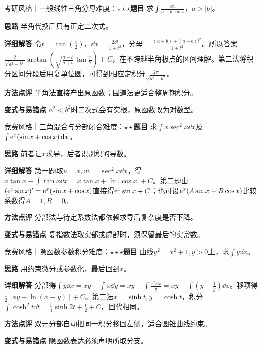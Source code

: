 \begin{example}{考研风格｜一般线性三角分母}{难度：$\star\star\star$}\label{deep:ex:integral_source_deep:triglinear}\textbf{题目} 求$\int\frac{\dd x}{a+b\cos x}$，$a>|b|$。\par\textbf{思路} 半角代换后只有正定二次式。\par\textbf{详细解答} 令$t=\tan(\frac{x}{2})$，$\dd x=\frac{2\dd t}{1+t^2}$，分母$=\frac{(a+b)+(a-b)t^2}{1+t^2}$。所以答案$\frac2{\sqrt{a^2-b^2}}\arctan\!\left(\sqrt{\frac{a-b}{a+b}}\tan\frac x2\right)+C$，在不跨越半角极点的区间理解。第二法将积分区间分段后用复单位圆，可得到相应定积分$\frac{2\pi}{\sqrt{a^2-b^2}}$。\par\textbf{方法点评} 半角法直接产出原函数；围道法更适合整周期积分。\par\textbf{变式与易错点} $a^2<b^2$时二次式会有实根，原函数改为对数型。\end{example}

\begin{example}{竞赛风格｜三角混合与分部闭合}{难度：$\star\star$}\label{deep:ex:integral_source_deep:trigmix}\textbf{题目} 求$\int x\sec^2x\dd x$及$\int \mathrm{e}^x(\sin x+\cos x)\mathop{}\!\mathrm{d} x$。\par\textbf{思路} 前者让$x$求导，后者识别积的导数。\par\textbf{详细解答} 第一题取$u=x,\dd v=\sec^2x\dd x$，得$x\tan x-\int\tan x\dd x=x\tan x+\ln|\cos x|+C$。第二题由$(\mathrm{e}^x\sin x)'=\mathrm{e}^x(\sin x+\cos x)$直接得$\mathrm{e}^x\sin x+C$；也可设$\mathrm{e}^x(A\sin x+B\cos x)$比较系数得$A=1,B=0$。\par\textbf{方法点评} 分部法与待定系数法都依赖求导后复杂度是否下降。\par\textbf{变式与易错点} 复指数法取实部或虚部时，须保留最后的实常数。\end{example}

\begin{example}{竞赛风格｜隐函数参数积分}{难度：$\star\star\star$}\label{deep:ex:integral_source_deep:implicit}\textbf{题目} 曲线$y^2=x^2+1,y>0$上，求$\int y\dd x$。\par\textbf{思路} 用约束微分或参数化，最后回到$x$。\par\textbf{详细解答} 分部得$\int y\dd x=xy-\int x\dd y=xy-\int \frac{x^2\dd x}{y}=xy-\int(y-\frac{1}{y})\dd x$。移项得$\frac12[xy+\ln(x+y)]+C$。第二法$x=\sinh t,y=\cosh t$，积分$\int\cosh^2t\dd t=\frac14\sinh2t+\frac{t}{2}+C$，回代相同。\par\textbf{方法点评} 双元分部自动把同一积分移回左侧，适合圆锥曲线约束。\par\textbf{变式与易错点} 隐函数表达必须声明所取分支。\end{example}

